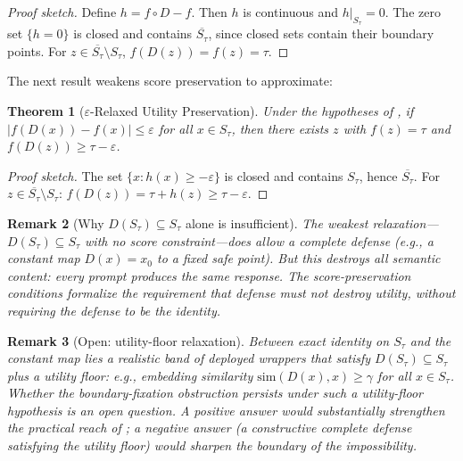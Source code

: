 \documentclass[11pt]{article}
\newtheorem{theorem}{Theorem}[section]
\newtheorem{remark}[theorem]{Remark}
\newcommand{\cl}[1]{\overline{#1}}
\begin{document}
\begin{proof}[Proof sketch]
Define $h = f \circ D - f$. Then $h$ is continuous and $h|_{S_\tau} = 0$.
The zero set $\{h = 0\}$ is closed and contains $\cl{S_\tau}$, since closed sets contain their boundary points. For
$z \in \cl{S_\tau} \setminus S_\tau$, $f(D(z)) = f(z) = \tau$.
\end{proof}

The next result weakens score preservation to approximate:

\begin{theorem}[$\varepsilon$-Relaxed Utility Preservation]
\label{thm:eps-relaxed}
Under the hypotheses of , if
$|f(D(x)) - f(x)| \leq \varepsilon$ for all $x \in S_\tau$, then
there exists $z$ with $f(z) = \tau$ and
$f(D(z)) \geq \tau - \varepsilon$.
\end{theorem}

\begin{proof}[Proof sketch]
The set $\{x : h(x) \geq -\varepsilon\}$ is closed and contains
$S_\tau$, hence $\cl{S_\tau}$. For
$z \in \cl{S_\tau} \setminus S_\tau$:
$f(D(z)) = \tau + h(z) \geq \tau - \varepsilon$.
\end{proof}


\begin{remark}[Why $D(S_\tau) \subseteq S_\tau$ alone is insufficient]
\label{rem:safe-preserving-escape}
The weakest relaxation---$D(S_\tau) \subseteq S_\tau$ with no score
constraint---does allow a complete defense (e.g., a constant map
$D(x) = x_0$ to a fixed safe point). But this destroys all semantic
content: every prompt produces the same response. The score-preservation
conditions formalize the requirement that defense must not destroy
utility, without requiring the defense to be the identity.
\end{remark}

\begin{remark}[Open: utility-floor relaxation]
\label{rem:utility-floor}
Between exact identity on $S_\tau$ and the constant map lies a
realistic band of deployed wrappers that satisfy
$D(S_\tau) \subseteq S_\tau$ plus a \emph{utility floor}: e.g.,
embedding similarity $\mathrm{sim}(D(x), x) \geq \gamma$ for all
$x \in S_\tau$. Whether the boundary-fixation obstruction persists
under such a utility-floor hypothesis is an open question.
A positive answer would substantially strengthen the practical reach
of ; a negative answer (a constructive complete
defense satisfying the utility floor) would sharpen the boundary of
the impossibility.
\end{remark}
\end{document}
